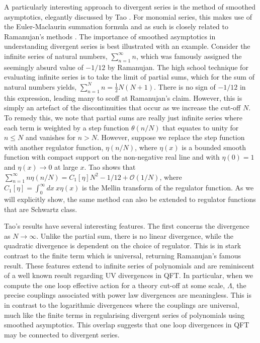\documentclass[11pt, letter]{article}
\begin{document}
A particularly interesting approach to divergent series is the method of smoothed asymptotics, elegantly discussed by Tao \citep{Tao11}.  For monomial series, this makes use of the Euler-Maclaurin summation formula and as such is closely related to Ramanujan's methods \citep{Berndt85,Hardy73}. The importance of smoothed asymptotics in understanding divergent series is best illustrated with an example. Consider the infinite series of natural numbers, $\sum_{n=1}^\infty n$, which was famously assigned the seemingly absurd value of $-1/12$  by Ramanujan. The high school technique for evaluating infinite series is to take the limit of partial sums, which for the sum of natural numbers yields, $\sum_{n=1}^N n = \frac{1}{2} N (N+1)$. There is no sign of $-1/12$ in this expression, leading many to scoff at Ramanujan's claim. However, this is simply an artefact of the discontinuities that occur as we increase the cut-off $N$. To remedy this, we note that partial sums are really just infinite series where each term is weighted by a step function $\theta(n/N)$ that equates to unity for $n\leq N$ and vanishes for $n>N$. However,  suppose we replace the step function with another regulator function, $\eta(n/N)$, where $\eta(x)$ is a bounded smooth function with compact support on the non-negative real line and with $\eta(0)=1$ and $\eta(x) \to 0$ at large $x$. Tao shows that $\sum_{n=1}^\infty n \eta(n/N) = C_1[\eta] N^2-1/12+\mathcal{O}(1/N)$, where  $C_1[\eta]=\int_0^\infty dx \ x \eta(x)$ is the Mellin transform of the regulator function.  As we  will  explicitly show, the same method can also be extended to regulator functions that are Schwartz class.

Tao's results have several interesting features. The first concerns the divergence as $N \to \infty$. Unlike the partial sum, there is no linear divergence, while the quadratic divergence is dependent on the choice of regulator. This is in stark contrast to the finite term which is universal, returning Ramanujan's famous result.  These features extend to infinite series of polynomials and are reminiscent of a well known result regarding UV divergences in QFT. In particular, when we compute the one loop effective action for a theory cut-off at some scale, $\Lambda$, the precise couplings associated with power law divergences are meaningless. This is in contrast to the logarithmic divergences where the couplings are universal, much like the finite terms in regularising divergent series of polynomials using smoothed asymptotics. This overlap suggests that one loop  divergences in QFT may be connected to divergent series. 
\end{document}
